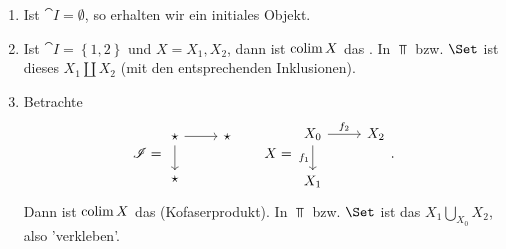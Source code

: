 \begin{example}
    \begin{enumerate}[1)]
        \item Ist $\cat{I} = \emptyset$, so erhalten wir ein initiales Objekt.
        \item Ist $\cat{I} = \left \{1,2\right\} $ und $X = X_1,X_2$, dann ist $\operatorname{colim} X$ das  . In $\Top$ bzw.  $\Set$ ist dieses  $X_1 \coprod X_2$ (mit den entsprechenden Inklusionen).
        \item Betrachte
            \[
            \cat{I} = 
            \begin{tikzcd}
                \star \ar{r} \ar{d} & \star \\
                \star
            \end{tikzcd}
            \qquad
            X = 
            \begin{tikzcd}
                X_0 \ar{r}{f_2} \ar[swap]{d}{f_1}&X_2 \\
                X_1
            \end{tikzcd}
            .\] 
            Dann ist $\operatorname{colim} X$ das   (Kofaserprodukt). In $\Top$ bzw.  $\Set$ ist das  $X_1 \bigcup\limits_{X_0} X_2$, also 'verkleben'.
    \end{enumerate}
\end{example}
